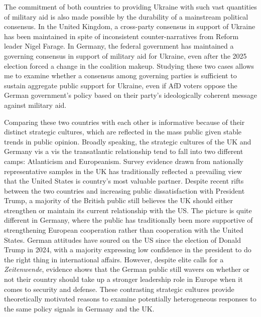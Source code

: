 The commitment of both countries to providing Ukraine with such vast quantities of military aid is also made possible by the durability of a mainstream political consensus. In the United Kingdom, a cross-party consensus in support of Ukraine has been maintained in spite of inconsistent counter-narratives from Reform leader Nigel Farage. In Germany, the federal government has maintained a governing consensus in support of military aid for Ukraine, even after the 2025 election forced a change in the coalition makeup. Studying these two cases allows me to examine whether a consensus among governing parties is sufficient to sustain aggregate public support for Ukraine, even if AfD voters oppose the German government's policy based on their party's ideologically coherent message against military aid.  

Comparing these two countries with each other is informative because of their distinct strategic cultures, which are reflected in the mass public given stable trends in public opinion.\autocite{gravelle_structure_2017} Broadly speaking, the strategic cultures of the UK and Germany vis a vis the transatlantic relationship tend to fall into two different camps: Atlanticism and Europeanism.\autocite{dunne_when_2004, mader_national_2014, mader_no_2023,toettoe_identarian_2024} Survey evidence drawn from nationally representative samples in the UK has traditionally reflected a prevailing view that the United States is country's most valuable partner. \autocite{aspinall_uk_2023, aspinall_uk_2024} Despite recent rifts between the two countries and increasing public dissatisfaction with President Trump, a majority of the British public still believes the UK should either strengthen or maintain its current relationship with the US.\autocite{aspinall_uk_2025} The picture is quite different in Germany, where the public has traditionally been more supportive of strengthening European cooperation rather than cooperation with the United States. \autocite{mader_national_2014, mader_no_2023, gavras_nato_2020, mader_public_2020} German attitudes have soured on the US since the election of Donald Trump in 2024, with a majority expressing low confidence in the president to do the right thing in international affairs.\autocite{wike_us_2025} However, despite elite calls for a \textit{Zeitenwende}, evidence shows that the German public still wavers on whether or not their country should take up a stronger leadership role in Europe when it comes to security and defense.\autocite{mader_no_2023, poushter_german_2025} These contrasting strategic cultures provide theoretically motivated reasons to examine potentially heterogeneous responses to the same policy signals in Germany and the UK. 

